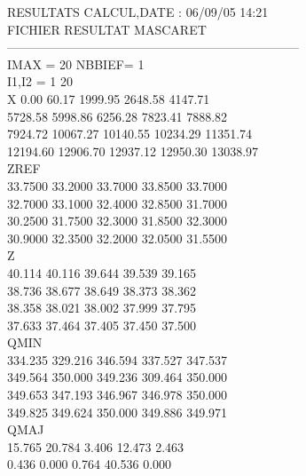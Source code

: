 \documentclass[a4paper,12pt]{article}
\begin{document}
  RESULTATS CALCUL,DATE :  06/09/05 14:21\\
  FICHIER RESULTAT MASCARET           \\                                    
  ----------------------------------------------------------------------- \\
   IMAX  =   20 NBBIEF=    1\\
   I1,I2 =    1   20\\
   X
           0.00        60.17      1999.95      2648.58      4147.71\\
        5728.58      5998.86      6256.28      7823.41      7888.82\\
        7924.72     10067.27     10140.55     10234.29     11351.74\\
       12194.60     12906.70     12937.12     12950.30     13038.97\\
   ZREF\\
        33.7500      33.2000      33.7000      33.8500      33.7000\\
        32.7000      33.1000      32.4000      32.8500      31.7000\\
        30.2500      31.7500      32.3000      31.8500      32.3000\\
        30.9000      32.3500      32.2000      32.0500      31.5500\\
   Z\\
         40.114       40.116       39.644       39.539       39.165\\
         38.736       38.677       38.649       38.373       38.362\\
         38.358       38.021       38.002       37.999       37.795\\
         37.633       37.464       37.405       37.450       37.500\\
   QMIN\\
        334.235      329.216      346.594      337.527      347.537\\
        349.564      350.000      349.236      309.464      350.000\\
        349.653      347.193      346.967      346.978      350.000\\
        349.825      349.624      350.000      349.886      349.971\\
   QMAJ\\
         15.765       20.784        3.406       12.473        2.463\\
          0.436        0.000        0.764       40.536        0.000\\
\end{document}
